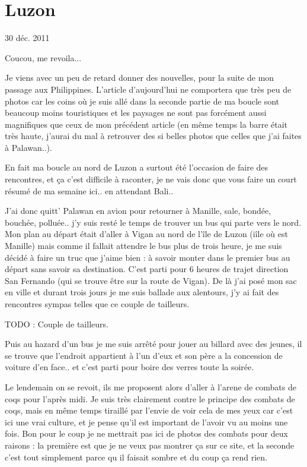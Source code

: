 \section{Luzon}

30 déc. 2011

\begin{multicols}{2}

Coucou, me revoila...

Je viens avec un peu de retard donner des nouvelles, pour la suite de mon passage aux Philippines. L'article d'aujourd'hui ne comportera que très peu de photos car les coins où je suis allé dans la seconde partie de ma boucle sont beaucoup moins touristiques et les paysages ne sont pas forcément aussi magnifiques que ceux de mon précédent article (en même temps la barre était très haute, j'aurai du mal à retrouver des si belles photos que celles que j'ai faites à Palawan..).

En fait ma boucle au nord de Luzon a surtout été l'occasion de faire des rencontres, et ça c'est difficile à raconter, je ne vais donc que vous faire un court résumé de ma semaine ici.. en attendant Bali..

J'ai donc quitt' Palawan en avion pour retourner à Manille, sale, bondée, bouchée, polluée.. j'y suis resté le temps de trouver un bus qui parte vers le nord. Mon plan au départ était d'aller à Vigan au nord de l'île de Luzon (iîle où est Manille) mais comme il fallait attendre le bus plus de trois heure, je me suis décidé à faire un truc que j'aime bien : à savoir monter dans le premier bus au départ sans savoir sa destination. C'est parti pour 6 heures de trajet direction San Fernando (qui se trouve être sur la route de Vigan). De là j'ai posé mon sac en ville et durant trois jours je me suis ballade aux alentours, j'y ai fait des rencontres sympas telles que ce couple de tailleurs.

TODO : Couple de tailleurs.

Puis au hazard d'un bus je me suis arrêté pour jouer au billard avec des jeunes, il se trouve que l'endroit appartient à l'un d'eux et son père a la concession de voiture d'en face.. et c'est parti pour boire des verres toute la soirée.


Le lendemain on se revoit, ils me proposent alors d'aller à l'arene de combats de coqs pour l'après midi. Je suis très clairement contre le principe des combats de coqs, mais en même temps tiraillé par l'envie de voir cela de mes yeux car c'est ici une vrai culture, et je pense qu'il est important de l'avoir vu au moins une fois. Bon pour le coup je ne mettrait pas ici de photos des combats pour deux raisons : la première est que je ne veux pas montrer ça sur ce site, et la seconde c'est tout simplement parce qu il faisait sombre et du coup ça rend rien.


\end{multicols}
